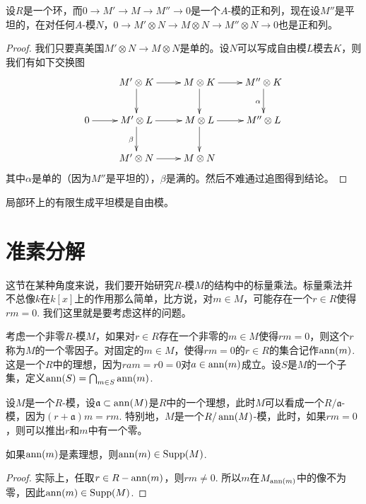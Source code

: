 \begin{pro}
	设$R$是一个环，而$0\to M'\to M\to M''\to 0$是一个$A$-模的正和列，现在设$M''$是平坦的，在对任何$A$-模$N$，$0\to M'\otimes N \to M\otimes N\to M''\otimes N\to 0$也是正和列。
\end{pro}

\begin{proof}
	我们只要真美国$M'\otimes N\to M\otimes N$是单的。设$N$可以写成自由模$L$模去$K$，则我们有如下交换图
	\[
		\xymatrix{
			& M'\otimes K \ar[r]\ar[d]& M\otimes K \ar[r]\ar[d]& M''\otimes K\ar[d]_{\alpha}\\
		0\ar[r]& M'\otimes L\ar[r]\ar[d]_\beta& M\otimes L\ar[r]\ar[d] & M''\otimes L\\
		& M'\otimes N \ar[r] & M\otimes N
		}
	\]
	其中$\alpha$是单的（因为$M''$是平坦的），$\beta$是满的。然后不难通过追图得到结论。
\end{proof}

\begin{pro}
	局部环上的有限生成平坦模是自由模。
\end{pro}

\section{准素分解}

这节在某种角度来说，我们要开始研究$R$-模$M$的结构中的标量乘法。标量乘法并不总像$k$在$k[x]$上的作用那么简单，比方说，对$m\in M$，可能存在一个$r\in R$使得$rm=0$. 我们这里就是要考虑这样的问题。

\para[零因子] 考虑一个非零$R$-模$M$，如果对$r\in R$存在一个非零的$m\in M$使得$rm=0$，则这个$r$称为$M$的一个零因子。对固定的$m\in M$，使得$rm=0$的$r\in R$的集合记作$\operatorname{ann}(m)$. 这是一个$R$中的理想，因为$ram=r0=0$对$a\in \operatorname{ann}(m)$成立。设$S$是$M$的一个子集，定义$\operatorname{ann}(S)=\bigcap_{m\in S}\operatorname{ann}(m)$.\endpara

设$M$是一个$R$-模，设$\mathfrak{a}\subset \operatorname{ann}(M)$是$R$中的一个理想，此时$M$可以看成一个$R/\mathfrak{a}$-模，因为$(r+\mathfrak{a})m=rm$. 特别地，$M$是一个$R/\operatorname{ann}(M)$-模，此时，如果$rm=0$，则可以推出$r$和$m$中有一个零。

\begin{lem}
	如果$\operatorname{ann}(m)$是素理想，则$\operatorname{ann}(m)\in \operatorname{Supp}(M)$.
\end{lem}

\begin{proof}
	实际上，任取$r\in R-\operatorname{ann}(m)$，则$rm\neq 0$. 所以$m$在$M_{\operatorname{ann}(m)}$中的像不为零，因此$\operatorname{ann}(m)\in \operatorname{Supp}(M)$.
\end{proof}

